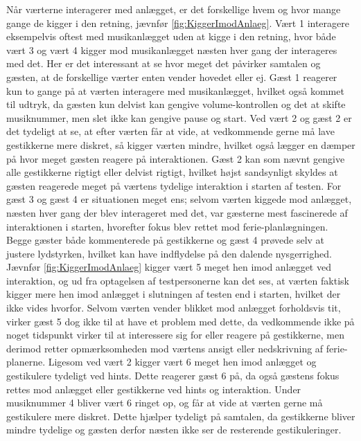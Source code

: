 Når værterne interagerer med anlægget, er det forskellige hvem og hvor mange gange de kigger i den retning, jævnfør \autoref{fig:KiggerImodAnlaeg}. Vært 1 interagere eksempelvis oftest med musikanlægget uden at kigge i den retning, hvor både vært 3 og vært 4 kigger mod musikanlægget næsten hver gang der interageres med det. Her er det interessant at se hvor meget det påvirker samtalen og gæsten, at de forskellige værter enten vender hovedet eller ej. Gæst 1 reagerer kun to gange på at værten interagere med musikanlægget, hvilket også kommet til udtryk, da gæsten kun delvist kan gengive volume-kontrollen og det at skifte musiknummer, men slet ikke kan gengive pause og start. Ved vært 2 og gæst 2 er det tydeligt at se, at efter værten får at vide, at vedkommende gerne må lave gestikkerne mere diskret, så kigger værten mindre, hvilket også lægger en dæmper på hvor meget gæsten reagere på interaktionen. Gæst 2 kan som nævnt gengive alle gestikkerne rigtigt eller delvist rigtigt, hvilket højst sandsynligt skyldes at gæsten reagerede meget på værtens tydelige interaktion i starten af testen. For gæst 3 og gæst 4 er situationen meget ens; selvom værten kiggede mod anlægget, næsten hver gang der blev interageret med det, var gæsterne mest fascinerede af interaktionen i starten, hvorefter fokus blev rettet mod ferie-planlægningen. Begge gæster både kommenterede på gestikkerne og gæst 4 prøvede selv at justere lydstyrken, hvilket kan have indflydelse på den dalende nysgerrighed. Jævnfør \autoref{fig:KiggerImodAnlaeg} kigger vært 5 meget hen imod anlægget ved interaktion, og ud fra optagelsen af testpersonerne kan det ses, at værten faktisk kigger mere hen imod anlægget i slutningen af testen end i starten, hvilket der ikke vides hvorfor. Selvom værten vender blikket mod anlægget forholdsvis tit, virker gæst 5 dog ikke til at have et problem med dette, da vedkommende ikke på noget tidspunkt virker til at interessere sig for eller reagere på gestikkerne, men derimod retter opmærksomheden mod værtens ansigt eller nedskrivning af ferie-planerne. Ligesom ved vært 2 kigger vært 6 meget hen imod anlægget og gestikulere tydeligt ved hints. Dette reagerer gæst 6 på, da også gæstens fokus rettes mod anlægget eller gestikkerne ved hints og interaktion. Under musiknummer 4 bliver vært 6 ringet op, og får at vide at værten gerne må gestikulere mere diskret. Dette hjælper tydeligt på samtalen, da gestikkerne bliver mindre tydelige og gæsten derfor næsten ikke ser de resterende gestikuleringer. 

